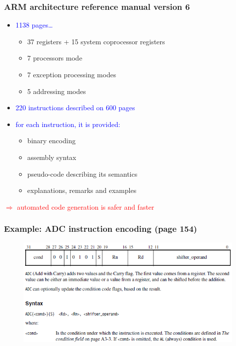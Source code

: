 \documentclass{beamer}
\newenvironment{f}[1]{\begin{frame}\frametitle{#1}}{\end{frame}}
\renewenvironment{i}{\begin{itemize}}{\end{itemize}}
\newcommand\red{\textcolor{red}}
\newcommand\blue{\textcolor{blue}}
\newcommand\vsp[1][3mm]{\vspace*{#1}}
\newcommand\hsp[1][3mm]{\hspace*{#1}}
\newcommand\A\Rightarrow
\begin{document}
\begin{f}{ARM architecture reference manual version 6}

\begin{i}\itemsep+3mm
\item \blue{1138 pages\ldots}
\begin{i}
\item 37 registers + 15 system coprocessor registers
\item 7 processors mode
\item 7 exception processing modes
\item 5 addressing modes
\end{i}
\item \blue{220 instructions described on 600 pages}
\item \blue{for each instruction, it is provided:}
\begin{i}
\item binary encoding
\item assembly syntax
\item pseudo-code describing its semantics
\item explanations, remarks and examples
\end{i}
\end{i}

\vsp\pause
\red{$\A$ automated code generation is safer and faster}

\end{f}


\begin{f}{Example: ADC instruction encoding (page 154)}

\begin{figure}
\vsp[-10mm]\hsp[-9mm]\includegraphics[scale=.6]{adc1}
\end{figure}

\end{f}
\end{document}
